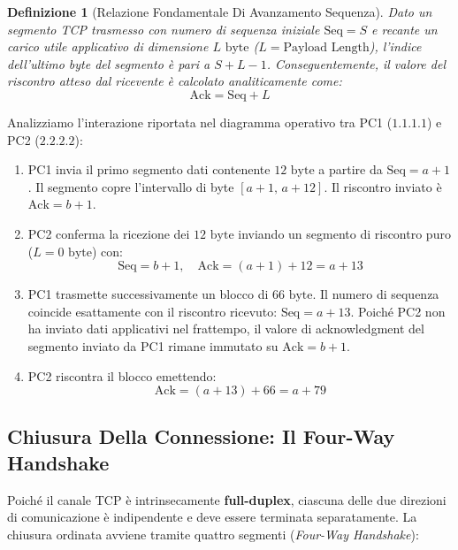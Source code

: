 \documentclass[11pt, a4paper]{article}
\newtheorem{theorem}{Definizione}
\begin{document}

\begin{theorem}[Relazione Fondamentale Di Avanzamento Sequenza]
Dato un segmento TCP trasmesso con numero di sequenza iniziale $\text{Seq} = S$ e recante un carico utile applicativo di dimensione $L\text{ byte}$ ($L = \text{Payload Length}$), l'indice dell'ultimo byte del segmento è pari a $S + L - 1$. Conseguentemente, il valore del riscontro atteso dal ricevente è calcolato analiticamente come:
\[
    \boxed{\text{Ack} = \text{Seq} + L}
\]
\end{theorem}

Analizziamo l'interazione riportata nel diagramma operativo tra PC1 ($1.1.1.1$) e PC2 ($2.2.2.2$):
\begin{enumerate}[noitemsep]
    \item PC1 invia il primo segmento dati contenente $12\text{ byte}$ a partire da $\text{Seq} = a + 1$. Il segmento copre l'intervallo di byte $[a+1, \, a+12]$. Il riscontro inviato è $\text{Ack} = b + 1$.
    \item PC2 conferma la ricezione dei $12\text{ byte}$ inviando un segmento di riscontro puro ($L = 0\text{ byte}$) con:
    \[
        \text{Seq} = b + 1, \quad \text{Ack} = (a + 1) + 12 = a + 13
    \]
    \item PC1 trasmette successivamente un blocco di $66\text{ byte}$. Il numero di sequenza coincide esattamente con il riscontro ricevuto: $\text{Seq} = a + 13$. Poiché PC2 non ha inviato dati applicativi nel frattempo, il valore di acknowledgment del segmento inviato da PC1 rimane immutato su $\text{Ack} = b + 1$.
    \item PC2 riscontra il blocco emettendo:
    \[
        \text{Ack} = (a + 13) + 66 = a + 79
    \]
\end{enumerate}

\subsection{Chiusura Della Connessione: Il Four-Way Handshake}

Poiché il canale TCP è intrinsecamente \textbf{full-duplex}, ciascuna delle due direzioni di comunicazione è indipendente e deve essere terminata separatamente. La chiusura ordinata avviene tramite quattro segmenti (\emph{Four-Way Handshake}):
\end{document}
